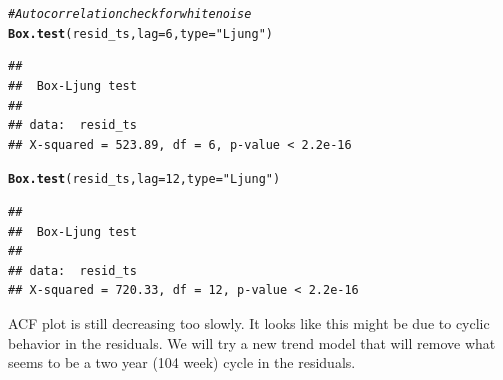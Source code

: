 \documentclass{article}\usepackage[]{graphicx}\usepackage[]{color}
\makeatletter
\newcommand{\hlnum}[1]{\textcolor[rgb]{0.686,0.059,0.569}{#1}}%
\newcommand{\hlstr}[1]{\textcolor[rgb]{0.192,0.494,0.8}{#1}}%
\newcommand{\hlcom}[1]{\textcolor[rgb]{0.678,0.584,0.686}{\textit{#1}}}%
\newcommand{\hlstd}[1]{\textcolor[rgb]{0.345,0.345,0.345}{#1}}%
\newcommand{\hlkwc}[1]{\textcolor[rgb]{0.333,0.667,0.333}{#1}}%
\newcommand{\hlkwd}[1]{\textcolor[rgb]{0.737,0.353,0.396}{\textbf{#1}}}%
\newenvironment{kframe}{%
 \def\at@end@of@kframe{}%
 \ifinner\ifhmode%
  \def\at@end@of@kframe{\end{minipage}}%
  \begin{minipage}{\columnwidth}%
 \fi\fi%
 \def\FrameCommand##1{\hskip\@totalleftmargin \hskip-\fboxsep
 \colorbox{shadecolor}{##1}\hskip-\fboxsep
     \hskip-\linewidth \hskip-\@totalleftmargin \hskip\columnwidth}%
 \MakeFramed {\advance\hsize-\width
   \@totalleftmargin\z@ \linewidth\hsize
   \@setminipage}}%
 {\par\unskip\endMakeFramed%
 \at@end@of@kframe}
\newenvironment{knitrout}{}{} %
\makeatother
\begin{document}
\begin{knitrout}
{}


\begin{kframe}\begin{alltt}
\hlcom{# Autocorrelation check for white noise}
\hlkwd{Box.test}\hlstd{(resid_ts,} \hlkwc{lag} \hlstd{=} \hlnum{6}\hlstd{,} \hlkwc{type} \hlstd{=} \hlstr{"Ljung"}\hlstd{)}
\end{alltt}
\begin{verbatim}
## 
## 	Box-Ljung test
## 
## data:  resid_ts
## X-squared = 523.89, df = 6, p-value < 2.2e-16
\end{verbatim}
\begin{alltt}
\hlkwd{Box.test}\hlstd{(resid_ts,} \hlkwc{lag} \hlstd{=} \hlnum{12}\hlstd{,} \hlkwc{type} \hlstd{=} \hlstr{"Ljung"}\hlstd{)}
\end{alltt}
\begin{verbatim}
## 
## 	Box-Ljung test
## 
## data:  resid_ts
## X-squared = 720.33, df = 12, p-value < 2.2e-16
\end{verbatim}
\end{kframe}
\end{knitrout}

ACF plot is still decreasing too slowly. It looks like this might be due to cyclic behavior in the residuals. We will try a new trend model that will remove what seems to be a two year (104 week) cycle in the residuals.
\end{document}
